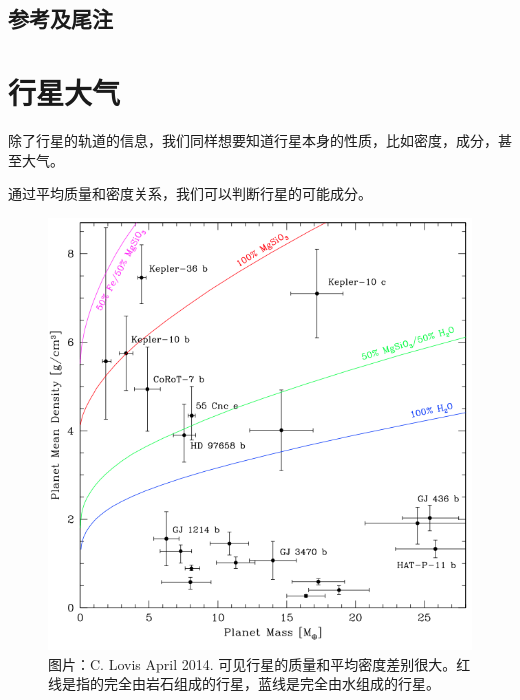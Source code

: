 \documentclass[letterpaper,10pt,english]{sphinxmanual}
\begin{document}
\subsection{参考及尾注}
\label{statistics:id19}

\section{行星大气}
\label{atmosphere::doc}\label{atmosphere:id1}
除了行星的轨道的信息，我们同样想要知道行星本身的性质，比如密度，成分，甚至大气。

通过平均质量和密度关系，我们可以判断行星的可能成分。
\begin{figure}[htbp]
\centering
\capstart

\includegraphics{massVSdensity.png}
\caption{图片：C. Lovis April 2014. 可见行星的质量和平均密度差别很大。红线是指的完全由岩石组成的行星，蓝线是完全由水组成的行星。}\end{figure}
\end{document}
